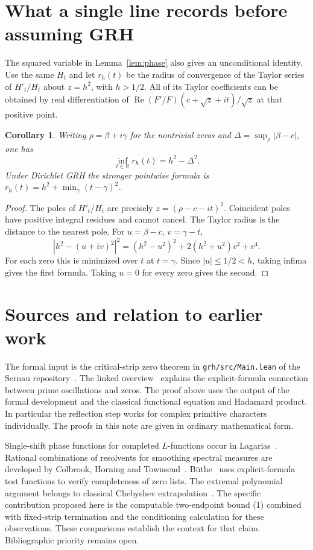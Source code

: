 \documentclass[11pt]{article}
\newtheorem{corollary}[theorem]{Corollary}
\newcommand{\R}{\mathbb R}
\newcommand{\Real}{\operatorname{Re}}
\begin{document}
\section{What a single line records before assuming GRH}
The squared variable in Lemma~\ref{lem:phase} also gives an unconditional
identity. Use the same $H_t$ and let $r_h(t)$ be the radius of convergence
of the Taylor series of $H'_t/H_t$ about $z=h^2$, with $h>1/2$. All of its
Taylor coefficients can be obtained by real differentiation of
$\Real(F'/F)(c+\sqrt z+it)/\sqrt z$ at that positive point.
\begin{corollary}
Writing $\rho=\beta+i\gamma$ for the nontrivial zeros and
$\Delta=\sup_\rho |\beta-c|$, one has
\[
 \inf_{t\in\R} r_h(t)=h^2-\Delta^2.
\]
Under Dirichlet GRH the stronger pointwise formula is
$r_h(t)=h^2+\min_\gamma(t-\gamma)^2$.
\end{corollary}
\begin{proof}
The poles of $H'_t/H_t$ are precisely $z=(\rho-c-it)^2$. Coincident poles
have positive integral residues and cannot cancel. The Taylor radius is the
distance to the nearest pole. For $u=\beta-c$, $v=\gamma-t$,
\[
 |h^2-(u+iv)^2|^2=(h^2-u^2)^2+2(h^2+u^2)v^2+v^4.
\]
For each zero this is minimized over $t$ at $t=\gamma$. Since
$|u|\le1/2<h$, taking infima gives the first formula. Taking $u=0$ for
every zero gives the second.
\end{proof}

\section*{Sources and relation to earlier work}
The formal input is the critical-strip zero theorem in
\texttt{grh/src/Main.lean} of the Sernau repository~\cite{lean}.
The linked overview~\cite{wiki} explains the explicit-formula connection
between prime oscillations and zeros. The proof above uses the output of
the formal development and the classical functional equation and Hadamard
product. In particular the reflection step works for complex primitive
characters individually. The proofs in this note are given in ordinary
mathematical form.

Single-shift phase functions for completed $L$-functions occur in
Lagarias~\cite{lagarias}. Rational combinations of resolvents for smoothing
spectral measures are developed by Colbrook, Horning and Townsend~\cite{cht}.
B\"uthe~\cite{buthe} uses explicit-formula test functions to verify completeness
of zero lists. The extremal polynomial argument belongs to classical
Chebyshev extrapolation~\cite{hl}. The specific contribution proposed here
is the computable two-endpoint bound (1) combined with fixed-strip termination
and the conditioning calculation for these observations. These comparisons
establish the context for that claim. Bibliographic priority remains open.
\end{document}
